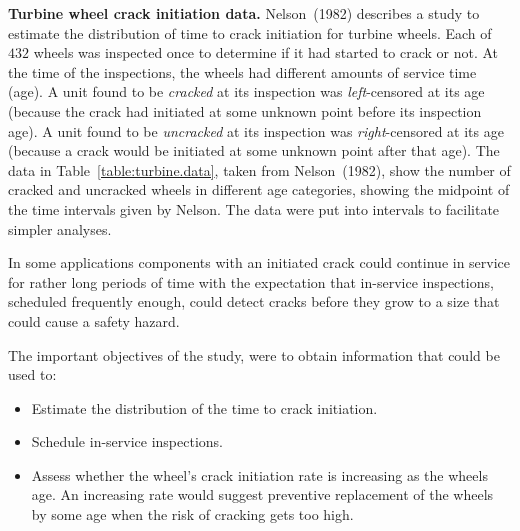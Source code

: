 \begin{example}
\label{example:turbine.wheel.data}
{\bf Turbine wheel crack initiation data.} Nelson~(1982) describes a
study to estimate the distribution of time to crack initiation for
turbine wheels.  Each of $432$ wheels was inspected once to determine
if it had started to crack or not.  At the time of the inspections,
the wheels had different amounts of service time (age). A unit found
to be {\em cracked} at its inspection was {\em left}-censored at its
age (because the crack had initiated at some unknown point before its
inspection age).  A unit found to be {\em uncracked} at its inspection
was {\em right}-censored at its age (because a crack would be
initiated at some unknown point after that age). The data in
Table~\ref{table:turbine.data}, taken from Nelson~(1982), show the
number of cracked and uncracked wheels in different age categories,
showing the midpoint of the time intervals given by Nelson.  The data
were put into intervals to facilitate simpler analyses.

In some applications components with an initiated crack could continue
in service for rather long periods of time with the expectation that
in-service inspections, scheduled frequently enough, could detect
cracks before they grow to a size that could cause a safety hazard.

The important objectives of the study,
were to obtain information that could be used to:
\begin{itemize}
\item 
Estimate the distribution of the time to crack initiation.
\item
Schedule in-service inspections.

\item
Assess whether the wheel's crack initiation rate is increasing as the
wheels age. An increasing rate would suggest 
preventive replacement of
the wheels by some age when the risk of cracking gets too high.
\end{itemize}


\end{example}
